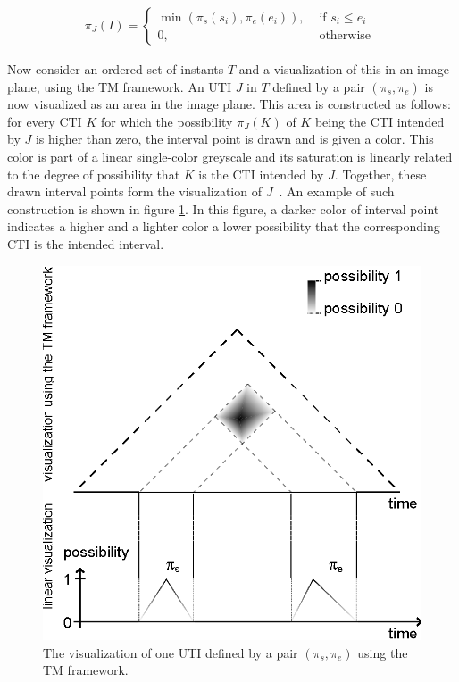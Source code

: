 \begin{align}
\pi_J(I) = \begin{cases}
 \min \left(\pi_s (s_i), \pi_e (e_i) \right), & \mbox{ if } s_i \leq e_i\\
0, & \mbox{ otherwise }
\end{cases}
\end{align}

Now consider an ordered set of instants $T$ and a visualization of this in an image plane, using the TM framework. An UTI $J$ in $T$ defined by a pair $(\pi_s, \pi_e)$ is now visualized as an area in the image plane. This area is constructed as follows: for every CTI $K$ for which the possibility $\pi_J(K)$ of $K$ being the CTI intended by $J$ is higher than zero, the interval point is drawn and is given a color. This color is part of a linear single-color greyscale and its saturation is linearly related to the degree of possibility that $K$ is the CTI intended by $J$. Together, these drawn interval points form the visualization of $J$~\cite{DeTre2012}. An example of such construction is shown in figure \ref{fig:tm-ill-const-ex}. In this figure, a darker color of interval point indicates a higher and a lighter color a lower possibility that the corresponding CTI is the intended interval.

\begin{figure}[h]
	\centering
	\includegraphics[width=0.9\columnwidth]{graphs/TM_model_ill_known.eps}
	\caption{The visualization of one UTI defined by a pair $(\pi_s, \pi_e)$ using the TM framework.}
	\label{fig:tm-ill-const-ex}
\end{figure}

